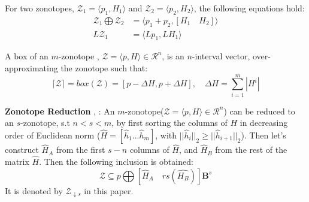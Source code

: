 \begin{lemma}
For two zonotopes, $\mathcal{Z}_1 = \langle p_1, H_1 \rangle$ and $\mathcal{Z}_2 = \langle p_2, H_2 \rangle$, the following equations hold:
\begin{equation}
\begin{split}
\mathcal{Z}_1 \bigoplus \mathcal{Z}_2 &= \langle p_1+p_2, [H_1 \quad H_2]\rangle \\
L\mathcal{Z}_1 &= \langle Lp_1, LH_1 \rangle 
\end{split}
\end{equation}
\end{lemma}
\begin{lemma} \cite{Althoff2010} \label{prop:overapprox}
A box of an $m$-zonotope , $\mathcal{Z} = \langle p, H \rangle \in \mathcal{R}^n$, is an $n$-interval vector, over-approximating the zonotope such that:
\begin{equation}
\lceil \mathcal{Z} \rceil = box(\mathcal{Z}) = [ p - \Delta H , p+ \Delta H], \quad \Delta H = \sum^{m}_{i=1} |H^i| 
\end{equation}
\end{lemma}
\begin{lemma}
\textbf{Zonotope Reduction} \cite{Alamo2005}, \cite{Combastel2003}: An $m$-zonotope($\mathcal{Z} = \langle p, H \rangle \in \mathcal{R}^n$) can be reduced to an $s$-zonotope, s.t $n < s < m$, by first sorting the columns of $H$ in decreasing order of Euclidean norm ($\hat{H}= [\hat{h}_1 ... \hat{h}_m]$, with $||\hat{h}_i||_2 \geq  ||\hat{h}_{i+1}||_2$). Then let's construct $\hat{H}_A$ from the first $s-n$ columns of $\hat{H}$, and  $\hat{H}_B$ from the rest of the matrix $\hat{H}$. Then the following inclusion is obtained:
\begin{equation}
\mathcal{Z} \subseteq p \bigoplus [\hat{H}_A \quad rs(\hat{H_B})]\textbf{B}^s
\end{equation}
It is denoted by $\mathcal{Z}_{\downarrow s}$ in this paper.
\end{lemma}

